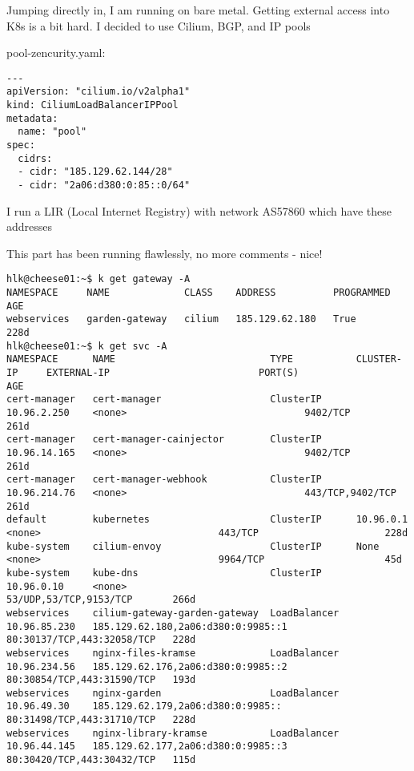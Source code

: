 \documentclass[Screen16to9,17pt]{foils}
\begin{document}

Jumping directly in, I am running on bare metal. Getting external access into K8s is a bit hard. I decided to use Cilium, BGP, and IP pools

pool-zencurity.yaml:
\begin{verbatim}
---
apiVersion: "cilium.io/v2alpha1"
kind: CiliumLoadBalancerIPPool
metadata:
  name: "pool"
spec:
  cidrs:
  - cidr: "185.129.62.144/28"
  - cidr: "2a06:d380:0:85::0/64"
\end{verbatim}

\begin{list2}
\item {}
\item I run a LIR (Local Internet Registry) with network AS57860 which have these addresses
\item This part has been running flawlessly, no more comments - nice!
\end{list2}




\begin{verbatim}
hlk@cheese01:~$ k get gateway -A
NAMESPACE     NAME             CLASS    ADDRESS          PROGRAMMED   AGE
webservices   garden-gateway   cilium   185.129.62.180   True         228d
hlk@cheese01:~$ k get svc -A
NAMESPACE      NAME                           TYPE           CLUSTER-IP     EXTERNAL-IP                          PORT(S)                      AGE
cert-manager   cert-manager                   ClusterIP      10.96.2.250    <none>                               9402/TCP                     261d
cert-manager   cert-manager-cainjector        ClusterIP      10.96.14.165   <none>                               9402/TCP                     261d
cert-manager   cert-manager-webhook           ClusterIP      10.96.214.76   <none>                               443/TCP,9402/TCP             261d
default        kubernetes                     ClusterIP      10.96.0.1      <none>                               443/TCP                      228d
kube-system    cilium-envoy                   ClusterIP      None           <none>                               9964/TCP                     45d
kube-system    kube-dns                       ClusterIP      10.96.0.10     <none>                               53/UDP,53/TCP,9153/TCP       266d
webservices    cilium-gateway-garden-gateway  LoadBalancer   10.96.85.230   185.129.62.180,2a06:d380:0:9985::1   80:30137/TCP,443:32058/TCP   228d
webservices    nginx-files-kramse             LoadBalancer   10.96.234.56   185.129.62.176,2a06:d380:0:9985::2   80:30854/TCP,443:31590/TCP   193d
webservices    nginx-garden                   LoadBalancer   10.96.49.30    185.129.62.179,2a06:d380:0:9985::    80:31498/TCP,443:31710/TCP   228d
webservices    nginx-library-kramse           LoadBalancer   10.96.44.145   185.129.62.177,2a06:d380:0:9985::3   80:30420/TCP,443:30432/TCP   115d

\end{verbatim}
\end{document}

